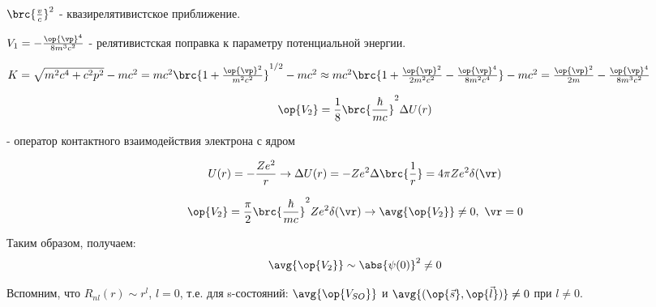 $\brc{\frac{v}{c}}^2$ - квазирелятивистское приближение.

$V_1 = -\frac{\op{\vp}^4}{8m^3c^2}$ - релятивистская поправка к параметру потенциальной энергии.

$
K = \sqrt{m^2c^4 + c^2p^2} - mc^2 = mc^2\brc{1 + \frac{\op{\vp}^2}{m^2c^2}}^{1/2} - mc^2 \approx mc^2\brc{1 + \frac{\op{\vp}^2}{2m^2c^2} - \frac{\op{\vp}^4}{8m^2c^4}} - mc^2 = \frac{\op{\vp}^2}{2m} - \frac{\op{\vp}^4}{8m^3c^2}
$

$$
\op{V_2} = \frac{1}{8} \brc{\frac{\hbar}{mc}}^2\Delta U(r) 
$$

- оператор контактного взаимодействия электрона с ядром

$$
U(r)  = -\frac{Ze^2}{r} \to \Delta U(r) = -Ze^2 \Delta \brc{\frac{1}{r}} = 4 \pi Ze^2 \delta(\vr)
$$

$$
\op{V_2} = \frac{\pi}{2} \brc{\frac{\hbar}{mc}}^2 Ze^2 \delta(\vr) \to \avg{\op{V_2}} \not = 0, ~\vr = 0
$$

Таким образом, получаем:
$$
\avg{\op{V_2}} \sim \abs{\psi(0)}^2 \not = 0
$$

Вспомним, что $R_{nl}(r) \sim r^l$, $l=0$, т.е. для s-состояний: 
$\avg{\op{V_{SO}}}$ и $\avg{(\op{\vec{s}}, \op{\vec{l}})} \neq 0$ при $l \neq 0$.
